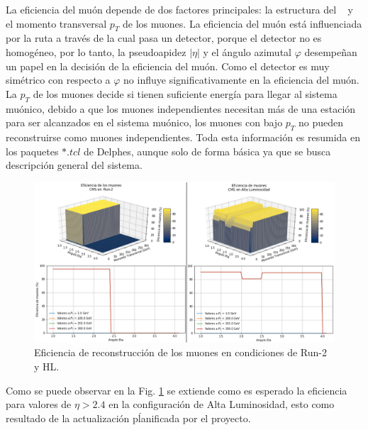 La eficiencia del muón depende de dos factores principales: la estructura del \CMS ~ y el momento transversal $p_T$ de los muones. La eficiencia del muón está influenciada por la ruta a través de la cual pasa un detector, porque el detector no es homogéneo, por lo tanto, la pseudoapidez $|\eta|$ y el ángulo azimutal $\varphi$ desempeñan un papel en la decisión de la eficiencia del muón. Como el detector es muy simétrico con respecto a $\varphi$ no influye significativamente en la eficiencia del muón. La $p_T$ de los muones decide si tienen suficiente energía para llegar al sistema muónico, debido a que los muones independientes necesitan más de una estación para ser alcanzados en el sistema muónico, los muones con bajo $p_T$ no pueden reconstruirse como muones independientes. Toda esta información es resumida en los paquetes $*.tcl$ de Delphes, aunque solo de forma básica ya que se busca descripción general del sistema.

\begin{figure}[ht]
\centering
\includegraphics[width=1\textwidth]{Analisis_y_Resultados/imagenes/Eficiencia_of_Muon.png}
\caption{Eficiencia de reconstrucción de los muones en condiciones de Run-2 y HL.}
\label{Compara_eficiencia_muon}
\end{figure}

Como se puede observar en la Fig. \ref{Compara_eficiencia_muon} se extiende como es esperado la eficiencia para valores de $\eta > 2.4$ en la configuración de Alta Luminosidad, esto como resultado de la actualización pĺanificada por el proyecto.






